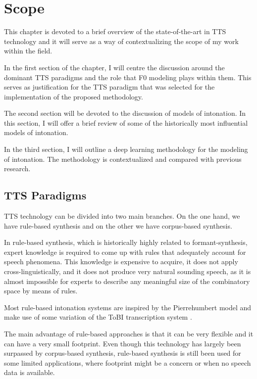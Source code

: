 
\chapter{Scope}\label{chap:scope}

This chapter is devoted to a brief overview of the state-of-the-art in \ac{TTS} technology and it will serve as a way of contextualizing the scope of my work within the field.

In the first section of the chapter, I will centre the discussion around the dominant \ac{TTS} paradigms and the role that \ac{F0} modeling plays within them.
This serves as justification for the \ac{TTS} paradigm that was selected for the implementation of the proposed methodology.

The second section will be devoted to the discussion of models of intonation.
In this section, I will offer a brief review of some of the historically most influential models of intonation.

In the third section, I will outline a deep learning methodology for the modeling of intonation.
The methodology is contextualized and compared with previous research.


\section{TTS Paradigms}\label{sec:tts-paradigms}

\ac{TTS} technology can be divided into two main branches.
On the one hand, we have rule-based synthesis and on the other we have corpus-based synthesis.

In rule-based synthesis, which is historically highly related to formant-synthesis, expert knowledge is required to come up with rules that adequately account for speech phenomena.
This knowledge is expensive to acquire, it does not apply cross-linguistically, and it does not produce very natural sounding speech, as it is almost impossible for experts to describe any meaningful size of the combinatory space by means of rules.

Most rule-based intonation systems are inspired by the Pierrehumbert model and make use of some variation of  the \ac{ToBI} transcription system \citep{Silverman1992ToBI}.

The main advantage of rule-based approaches is that it can be very flexible and it can have a very small footprint.
Even though this technology has largely been surpassed by corpus-based synthesis, rule-based synthesis is still been used for some limited applications, where footprint might be a concern or when no speech data is available.



